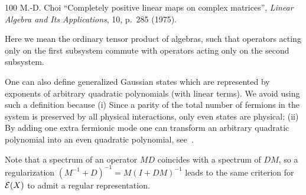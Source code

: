 \documentclass[twocolumn,showpacs,preprintnumbers,superscriptaddress]{revtex4}
\newcommand{\calE}{{\cal E }}
\begin{document}
\begin{thebibliography}{100}
 M.-D. Choi ``Completely positive linear maps on complex matrices'',
{\it Linear Algebra and Its Applications}, 10, p.~285  (1975).



%
 Here we mean the ordinary tensor product of algebras,
such that operators acting only on the first subsystem  commute with operators
acting only on the second subsystem.

 One can also define
generalized Gaussian states which are represented by exponents of 
arbitrary quadratic polynomials (with linear terms). We avoid 
using such a definition because (i) Since a parity of the total
number of fermions in the system is preserved by all physical
interactions, only even states are physical; (ii) By adding one
extra fermionic mode one can transform an arbitrary quadratic 
polynomial into an even quadratic polynomial, see~\cite{Knill01}.


 Note that a spectrum of an operator $MD$
coincides with a spectrum of $DM$, so a regularization
$(M^{-1}+D)^{-1}=M(I+DM)^{-1}$ leads to the same 
criterion for $\calE(X)$ to admit a regular representation.

\end{thebibliography}
\end{document}
